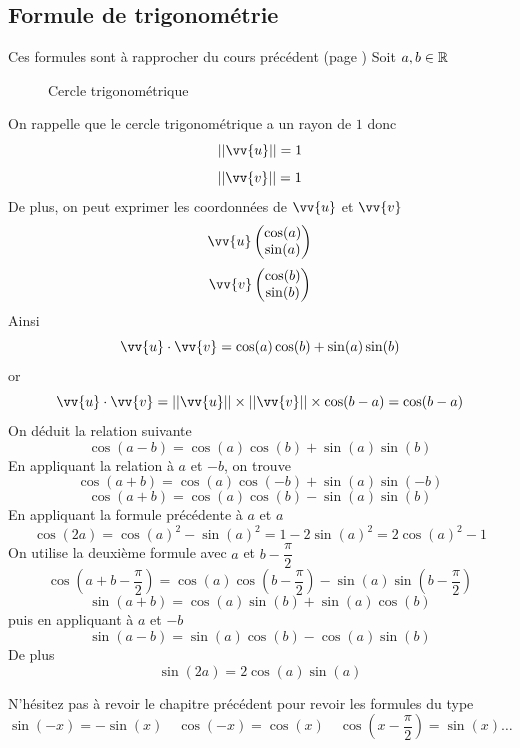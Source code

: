 \subsection{Formule de trigonométrie}
Ces formules sont à rapprocher du cours précédent (page \pageref{chap:trigo})\newline
Soit $a,b \in \mathbb{R}$ \newline
\begin{figure}[H]
\centering
{}
\caption{Cercle trigonométrique}
\end{figure} 
On rappelle que le cercle trigonométrique a un rayon de $1$ donc 
$$||\vv{u}|| = 1$$
$$||\vv{v}|| = 1$$
De plus, on peut exprimer les coordonnées de $\vv{u}$ et $\vv{v}$
$$\vv{u} \covec{\cos(a)}{\sin(a)}$$
$$\vv{v} \covec{\cos(b)}{\sin(b)}$$
Ainsi 
$$\vv{u} \cdot \vv{v} = \cos(a) \cos(b) + \sin(a)\sin(b)$$
or 
$$\vv{u} \cdot \vv{v} = ||\vv{u}||\times||\vv{v}||\times \cos(b-a) = \cos(b-a)$$
On déduit la relation suivante 
$$\boxed{\cos(a-b) = \cos(a) \cos(b) + \sin(a)\sin(b)}$$
En appliquant la relation à $a$ et $-b$, on trouve 
$$\cos(a+b) = \cos(a) \cos(-b) + \sin(a)\sin(-b)$$
$$\boxed{\cos(a+b) = \cos(a)\cos(b) -\sin(a)\sin(b)}$$
En appliquant la formule précédente à $a$ et $a$
$$\boxed{\cos(2a) = \cos(a)^2-\sin(a)^2 = 1 - 2\sin(a)^2 = 2\cos(a)^2-1}$$
On utilise la deuxième formule avec $a$ et $b-\dfrac{\pi}{2}$ 
$$\cos(a+b-\dfrac{\pi}{2}) = \cos(a)\cos(b - \dfrac{\pi}{2}) -\sin(a)\sin(b-\dfrac{\pi}{2})$$
$$\boxed{\sin(a+b) = \cos(a)\sin(b) + \sin(a)\cos(b)}$$
puis en appliquant à $a$ et $-b$
$$\boxed{\sin(a-b) =\sin(a)\cos(b) -\cos(a)\sin(b)}$$
De plus 
$$\boxed{\sin(2a) = 2\cos(a)\sin(a)}$$
\begin{remarque}
N'hésitez pas à revoir le chapitre précédent pour revoir les formules du type $$\sin(-x) = -\sin(x) \quad \cos(-x) = \cos(x) \quad \cos(x-\dfrac{\pi}{2}) = \sin(x) \ldots$$
\end{remarque}
